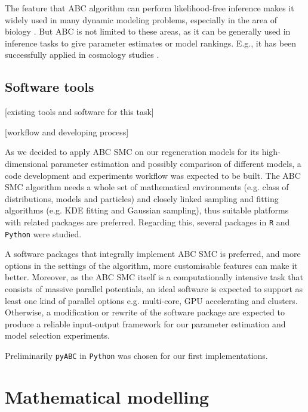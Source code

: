 \documentclass[12pt,a4paper]{report}
\begin{document}
The feature that ABC algorithm can perform likelihood-free inference makes it widely used in many dynamic modeling problems, especially in the area of biology \cite{ref:abcsysbio, ref:compare, ref:disease}. But ABC is not limited to these areas, as it can be generally used in inference tasks to give parameter estimates or model rankings. E.g., it has been successfully applied in cosmology studies \cite{cosmology}.



\section{Software tools}

 [existing tools and software for this task]

 [workflow and developing process]

 As we decided to apply ABC SMC on our regeneration models for its high-dimensional parameter estimation and possibly comparison of different models, a code development and experiments workflow was expected to be built. The ABC SMC algorithm needs a whole set of mathematical environments (e.g. class of distributions, models and particles) and closely linked sampling and fitting algorithms (e.g. KDE fitting and Gaussian sampling), thus suitable platforms with related packages are preferred. Regarding this, several packages in \verb|R| and \verb|Python| were studied.

 A software packages that integrally implement ABC SMC is preferred, and more options in the settings of the algorithm, more customisable features can make it better. Moreover, as the ABC SMC itself is a computationally intensive task that consists of massive parallel potentials, an ideal software is expected to support as least one kind of parallel options e.g. multi-core, GPU accelerating and clusters. Otherwise, a modification or rewrite of the software package are expected to produce a reliable input-output framework for our parameter estimation and model selection experiments.

 Preliminarily \verb|pyABC| \cite{ref:pyabc} in \verb|Python| was chosen for our first implementations. 













\chapter{Mathematical modelling}
\end{document}
